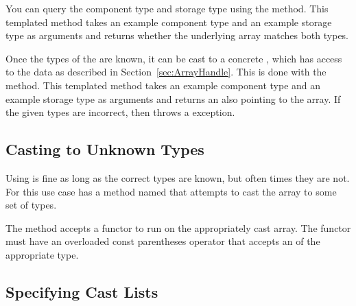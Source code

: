 You can query the component type and storage type using the
 method. This templated method takes an
example component type and an example storage type as arguments and
returns whether the underlying array matches both types.


Once the types of the  are known, it can
be cast to a concrete , which has access to the
data as described in Section~\ref{sec:ArrayHandle}. This is done with the
 method. This templated method takes an example
component type and an example storage type as arguments and returns an
 also pointing to the array. If the given types
are incorrect, then  throws a
 exception.


\subsection{Casting to Unknown Types}


Using  is fine as long as the correct types are
known, but often times they are not. For this use case
 has a method named
 that attempts to cast the array to some set of
types.

The  method accepts a functor to run on the
appropriately cast array. The functor must have an overloaded const
parentheses operator that accepts an  of the
appropriate type.


\subsection{Specifying Cast Lists}
\label{sec:DynamicArrayHandleSpecifyingCastLists}

